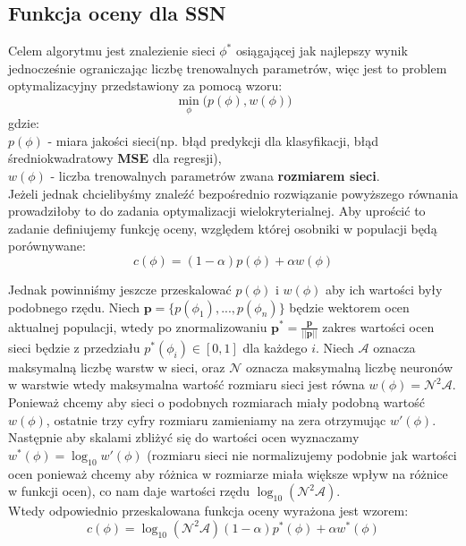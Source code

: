 \documentclass{article}
\renewcommand{\vec}[1]{\mathbf{#1}}
\begin{document}
\subsection{Funkcja oceny dla SSN}
\label{sec:ocena}
Celem algorytmu jest znalezienie sieci $\phi^{*}$ osiągającej jak najlepszy wynik jednocześnie
ograniczając liczbę trenowalnych parametrów, więc jest to problem optymalizacyjny 
przedstawiony za pomocą wzoru:
\begin{equation}
	\underset{\phi}{\min}\big(p(\phi), w(\phi)\big)
\end{equation}
gdzie:\\
$p(\phi)$ - miara jakości sieci(np. błąd predykcji dla klasyfikacji, błąd średniokwadratowy 
\textbf{MSE} dla regresji),\\
$w(\phi)$ - liczba trenowalnych parametrów zwana \textbf{rozmiarem sieci}.\\
Jeżeli jednak chcielibyśmy znaleźć bezpośrednio rozwiązanie powyższego równania
prowadziłoby to do zadania optymalizacji wielokryterialnej. Aby uprościć to zadanie
definiujemy funkcję oceny, względem której osobniki w populacji będą porównywane:
\begin{equation}
	c(\phi) = (1 - \alpha)p(\phi) + \alpha w(\phi)
\end{equation}

Jednak powinniśmy jeszcze przeskalować $p(\phi)$ i $w(\phi)$ aby ich wartości były podobnego 
rzędu. Niech $\vec{p} = \{p(\phi_1), ..., p(\phi_n)\}$ będzie wektorem ocen aktualnej populacji,
wtedy po znormalizowaniu $\vec{p}^{*} = \frac{\vec{p}}{||\vec{p}||}$ zakres wartości ocen sieci
będzie z przedziału $p^{*}(\phi_i) \in [0, 1]$ dla każdego $i$. Niech $\mathcal{A}$ oznacza
maksymalną liczbę warstw w sieci, oraz $\mathcal{N}$ oznacza maksymalną liczbę neuronów w 
warstwie wtedy maksymalna wartość rozmiaru sieci jest równa $w(\phi) = \mathcal{N}^2\mathcal{A}$.
Ponieważ chcemy aby sieci o podobnych rozmiarach miały podobną wartość $w(\phi)$,
ostatnie trzy cyfry rozmiaru zamieniamy na zera otrzymując $w'(\phi)$.
Następnie aby skalami zbliżyć się do 
wartości ocen  wyznaczamy $w^{*}(\phi) = \log_{10}w'(\phi)$ (rozmiaru sieci
nie normalizujemy podobnie jak wartości ocen ponieważ chcemy aby różnica w rozmiarze
miała większe wpływ na różnice w funkcji ocen), co nam daje wartości
rzędu $\log_{10}(\mathcal{N}^2\mathcal{A})$.\\
Wtedy odpowiednio przeskalowana funkcja oceny wyrażona jest wzorem:
\begin{equation}
	c(\phi) = \log_{10}(\mathcal{N}^2\mathcal{A})(1 - \alpha)p^{*}(\phi) + \alpha w^{*}(\phi)
\end{equation}
\end{document}
